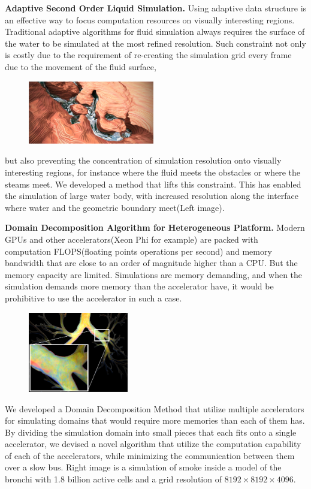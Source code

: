 \documentclass[11pt]{article}
\begin{document}
\textbf{Adaptive Second Order Liquid Simulation.} Using adaptive data structure is an effective way to focus computation resources on visually interesting regions. Traditional adaptive algorithms for fluid simulation always requires the surface of the water to be simulated at the most refined resolution. Such constraint not only is costly due to the requirement of re-creating the simulation grid every frame due to the movement of the fluid surface, 
\begin{figure}
\includegraphics[width=0.49\textwidth]{River}
\end{figure}
but also preventing the concentration of simulation resolution onto visually interesting regions, for instance where the fluid meets the obstacles or where the steams meet. 
We developed a method that lifts this constraint\cite{Power}. This has enabled the simulation of large water body, with increased resolution along the interface where water and the geometric boundary meet(Left image). 

\textbf{Domain Decomposition Algorithm for Heterogeneous Platform.} Modern GPUs and other accelerators(Xeon Phi for example) are packed with computation FLOPS(floating points operations per second) and memory bandwidth that are close to an order of magnitude higher than a CPU. But the memory capacity are limited. Simulations are memory demanding, and when the simulation demands more memory than the accelerator have, it would be prohibitive to use the accelerator in such a case.
\begin{figure}
\includegraphics[width=0.39\textwidth]{Bronki}
\end{figure} 
We developed a Domain Decomposition Method that utilize multiple accelerators for simulating domains that would require more memories than each of them has. By dividing the simulation domain into small pieces that each fits onto a single accelerator, we devised a novel algorithm that utilize the computation capability of each of the accelerators, while minimizing the communication between them over a slow bus. Right image is a simulation of smoke inside a model of the bronchi with 1.8 billion active cells and a grid resolution of $8192 \times 8192 \times 4096$.
\end{document}
